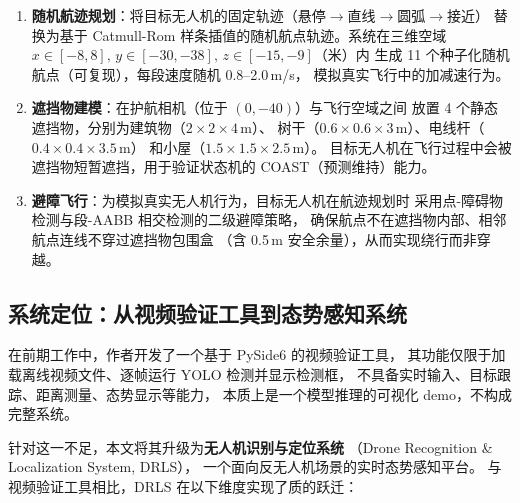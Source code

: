 \documentclass[12pt, a4paper]{ctexart}
\begin{document}
\begin{enumerate}
  \item \textbf{随机航迹规划}：将目标无人机的固定轨迹（悬停$\rightarrow$直线$\rightarrow$圆弧$\rightarrow$接近）
        替换为基于 Catmull-Rom 样条插值的随机航点轨迹。系统在三维空域
        $x \in [-8, 8],\, y \in [-30, -38],\, z \in [-15, -9]$（米）内
        生成 11 个种子化随机航点（可复现），每段速度随机 0.8--2.0\,m/s，
        模拟真实飞行中的加减速行为。

  \item \textbf{遮挡物建模}：在护航相机（位于 $(0, -40)$）与飞行空域之间
        放置 4 个静态遮挡物，分别为建筑物（$2\times2\times4$\,m）、
        树干（$0.6\times0.6\times3$\,m）、电线杆（$0.4\times0.4\times3.5$\,m）
        和小屋（$1.5\times1.5\times2.5$\,m）。
        目标无人机在飞行过程中会被遮挡物短暂遮挡，用于验证状态机的
        COAST（预测维持）能力。

  \item \textbf{避障飞行}：为模拟真实无人机行为，目标无人机在航迹规划时
        采用点-障碍物检测与段-AABB 相交检测的二级避障策略，
        确保航点不在遮挡物内部、相邻航点连线不穿过遮挡物包围盒
        （含 0.5\,m 安全余量），从而实现绕行而非穿越。
\end{enumerate}

\subsection{系统定位：从视频验证工具到态势感知系统}

在前期工作中，作者开发了一个基于 PySide6 的视频验证工具，
其功能仅限于加载离线视频文件、逐帧运行 YOLO 检测并显示检测框，
不具备实时输入、目标跟踪、距离测量、态势显示等能力，
本质上是一个模型推理的可视化 demo，不构成完整系统。

针对这一不足，本文将其升级为\textbf{无人机识别与定位系统}
（Drone Recognition \& Localization System, DRLS），
一个面向反无人机场景的实时态势感知平台。
与视频验证工具相比，DRLS 在以下维度实现了质的跃迁：
\end{document}
